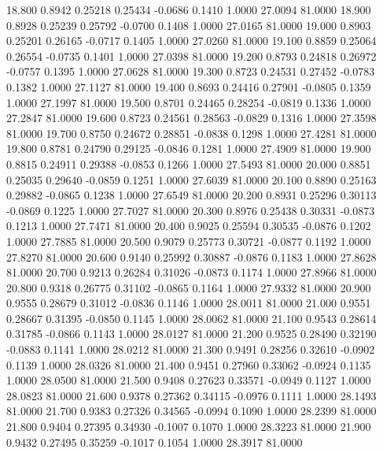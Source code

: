   18.800   0.8942   0.25218   0.25434  -0.0686   0.1410   1.0000  27.0094  81.0000
  18.900   0.8928   0.25239   0.25792  -0.0700   0.1408   1.0000  27.0165  81.0000
  19.000   0.8903   0.25201   0.26165  -0.0717   0.1405   1.0000  27.0260  81.0000
  19.100   0.8859   0.25064   0.26554  -0.0735   0.1401   1.0000  27.0398  81.0000
  19.200   0.8793   0.24818   0.26972  -0.0757   0.1395   1.0000  27.0628  81.0000
  19.300   0.8723   0.24531   0.27452  -0.0783   0.1382   1.0000  27.1127  81.0000
  19.400   0.8693   0.24416   0.27901  -0.0805   0.1359   1.0000  27.1997  81.0000
  19.500   0.8701   0.24465   0.28254  -0.0819   0.1336   1.0000  27.2847  81.0000
  19.600   0.8723   0.24561   0.28563  -0.0829   0.1316   1.0000  27.3598  81.0000
  19.700   0.8750   0.24672   0.28851  -0.0838   0.1298   1.0000  27.4281  81.0000
  19.800   0.8781   0.24790   0.29125  -0.0846   0.1281   1.0000  27.4909  81.0000
  19.900   0.8815   0.24911   0.29388  -0.0853   0.1266   1.0000  27.5493  81.0000
  20.000   0.8851   0.25035   0.29640  -0.0859   0.1251   1.0000  27.6039  81.0000
  20.100   0.8890   0.25163   0.29882  -0.0865   0.1238   1.0000  27.6549  81.0000
  20.200   0.8931   0.25296   0.30113  -0.0869   0.1225   1.0000  27.7027  81.0000
  20.300   0.8976   0.25438   0.30331  -0.0873   0.1213   1.0000  27.7471  81.0000
  20.400   0.9025   0.25594   0.30535  -0.0876   0.1202   1.0000  27.7885  81.0000
  20.500   0.9079   0.25773   0.30721  -0.0877   0.1192   1.0000  27.8270  81.0000
  20.600   0.9140   0.25992   0.30887  -0.0876   0.1183   1.0000  27.8628  81.0000
  20.700   0.9213   0.26284   0.31026  -0.0873   0.1174   1.0000  27.8966  81.0000
  20.800   0.9318   0.26775   0.31102  -0.0865   0.1164   1.0000  27.9332  81.0000
  20.900   0.9555   0.28679   0.31012  -0.0836   0.1146   1.0000  28.0011  81.0000
  21.000   0.9551   0.28667   0.31395  -0.0850   0.1145   1.0000  28.0062  81.0000
  21.100   0.9543   0.28614   0.31785  -0.0866   0.1143   1.0000  28.0127  81.0000
  21.200   0.9525   0.28490   0.32190  -0.0883   0.1141   1.0000  28.0212  81.0000
  21.300   0.9491   0.28256   0.32610  -0.0902   0.1139   1.0000  28.0326  81.0000
  21.400   0.9451   0.27960   0.33062  -0.0924   0.1135   1.0000  28.0500  81.0000
  21.500   0.9408   0.27623   0.33571  -0.0949   0.1127   1.0000  28.0823  81.0000
  21.600   0.9378   0.27362   0.34115  -0.0976   0.1111   1.0000  28.1493  81.0000
  21.700   0.9383   0.27326   0.34565  -0.0994   0.1090   1.0000  28.2399  81.0000
  21.800   0.9404   0.27395   0.34930  -0.1007   0.1070   1.0000  28.3223  81.0000
  21.900   0.9432   0.27495   0.35259  -0.1017   0.1054   1.0000  28.3917  81.0000
